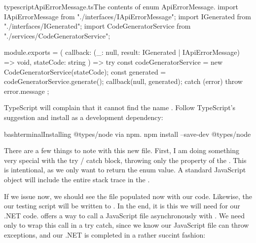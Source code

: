 \documentclass[a4paper,headinclude=on,footinclude=on,12pt,oneside]{scrbook}
\begin{document}
\begin{codeInput}{typescript}{ApiErrorMessage.ts}{The contents of enum ApiErrorMessage.}
import IApiErrorMessage from "./interfaces/IApiErrorMessage";
import IGenerated from "./interfaces/IGenerated";
import CodeGeneratorService from "./services/CodeGeneratorService";

module.exports = (
  callback: (_: null, result: IGenerated | IApiErrorMessage) => void,
  stateCode: string
) => {
  try {
    const codeGeneratorService = new CodeGeneratorService(stateCode);
    const generated = codeGeneratorService.generate();
    callback(null, generated);
  } catch (error) {
    throw error.message
  }
};  
\end{codeInput}

TypeScript will complain that it cannot find the name . Follow TypeScript's suggestion and install  as a development dependency:

\begin{codeInput}{bash}{terminal}{Installing @types/node via npm.}
npm install --save-dev @types/node
\end{codeInput}

There are a few things to note with this new  file. First, I am doing something very special with the try / catch block, throwing only the  property of the . This is intentional, as we only want to return the  enum value. A standard JavaScript  object will include the entire stack trace in the .

If we issue  now, we should see the  file populated now with our  code. Likewise, the our testing script will be written to . In the end, it is this  we will need for our .NET code.  offers a way to call a JavaScript file asynchronously with . We need only to wrap this call in a try catch, since we know our JavaScript file can throw exceptions, and our .NET  is completed in a rather succint fashion:
\end{document}
